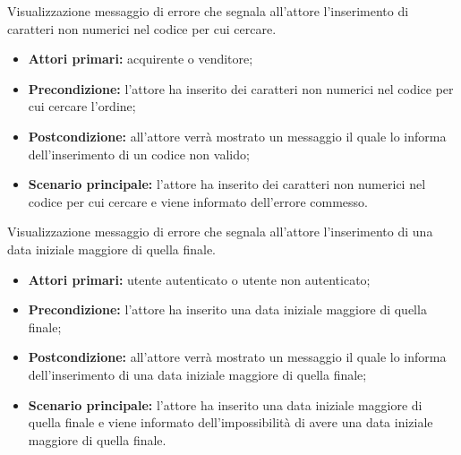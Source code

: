 \label{estensione:codice-ordine-non-valido}

Visualizzazione messaggio di errore che segnala all'attore l'inserimento di caratteri non numerici nel codice per cui cercare.
\begin{itemize}
    \item \textbf{Attori primari:} acquirente o venditore;
    \item \textbf{Precondizione:} l'attore ha inserito dei caratteri non numerici nel codice per cui cercare l'ordine;
    \item \textbf{Postcondizione:} all'attore verrà mostrato un messaggio il quale lo informa dell'inserimento di un codice non valido;
    \item \textbf{Scenario principale:} l'attore ha inserito dei caratteri non numerici nel codice per cui cercare e viene informato dell'errore commesso.
\end{itemize}

\label{estensione:data-iniziale-maggiore-data-finale}

Visualizzazione messaggio di errore che segnala all'attore l'inserimento di una data iniziale maggiore di quella finale.
\begin{itemize}
    \item \textbf{Attori primari:} utente autenticato o utente non autenticato;
    \item \textbf{Precondizione:} l'attore ha inserito una data iniziale maggiore di quella finale;
    \item \textbf{Postcondizione:} all'attore verrà mostrato un messaggio il quale lo informa dell'inserimento di una data iniziale maggiore di quella finale;
    \item \textbf{Scenario principale:} l'attore ha inserito una data iniziale maggiore di quella finale e viene informato dell'impossibilità di avere una data iniziale maggiore di quella finale.
\end{itemize}

\label{estensione:quantita-da-aggiungere-al-carrello-non-valida}

